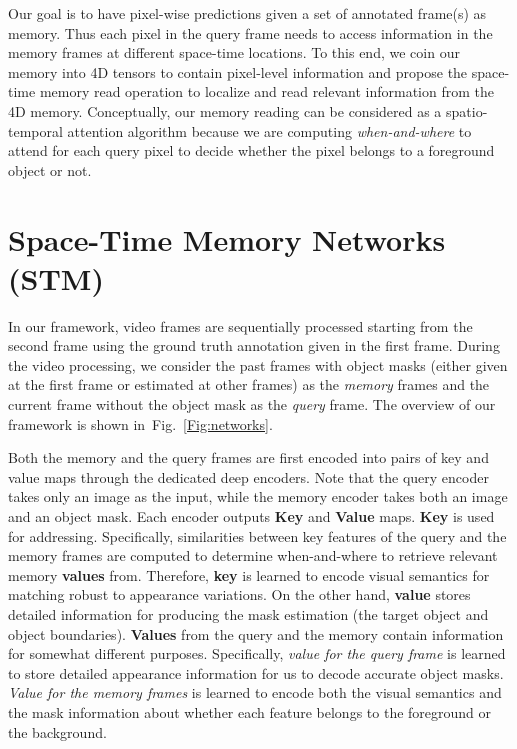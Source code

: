 \documentclass[10pt,twocolumn,letterpaper]{article}
\newcommand{\fref}[1]{Fig.~\ref{#1}}
\begin{document}
Our goal is to have pixel-wise predictions given a set of annotated frame(s) as memory.
Thus each pixel in the query frame needs to access information in the memory frames at different space-time locations.
To this end, we coin our memory into 4D tensors to contain pixel-level information and propose the space-time memory read operation to localize and read relevant information from the 4D memory. 
Conceptually, our memory reading can be considered as a spatio-temporal attention algorithm because we are computing \textit{when-and-where} to attend for each query pixel to decide whether the pixel belongs to a foreground object or not. 















\section{Space-Time Memory Networks (STM)}
In our framework, video frames are sequentially processed starting from the second frame using the ground truth annotation given in the first frame.
During the video processing, we consider the past frames with object masks (either given at the first frame or estimated at other frames) as the \textit{memory} frames and the current frame without the object mask as the \textit{query} frame.
The overview of our framework is shown in~\fref{Fig:networks}. 

Both the memory and the query frames are first encoded into pairs of key and value maps through the dedicated deep encoders. 
Note that the query encoder takes only an image as the input, while the memory encoder takes both an image and an object mask. Each encoder outputs \textbf{Key} and \textbf{Value} maps. \textbf{Key} is used for addressing. Specifically, similarities between key features of the query and the memory frames are computed to determine when-and-where to retrieve relevant memory \textbf{values} from. Therefore, \textbf{key} is learned to encode visual semantics for matching robust to appearance variations. 
On the other hand, \textbf{value} stores detailed information for producing the mask estimation (\eg the target object and object boundaries). 
\textbf{Values} from the query and the memory contain information for somewhat different purposes.
Specifically, \textit{value for the query frame} is learned to store detailed appearance information for us to decode accurate object masks. \textit{Value for the memory frames} is learned to encode both the visual semantics and the mask information about whether each feature belongs to the foreground or the background.
\end{document}
